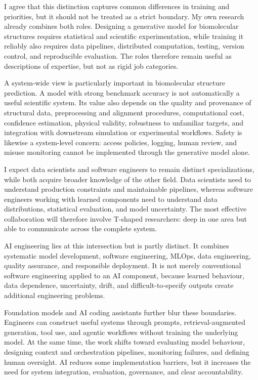 \documentclass[a4paper,11pt]{article}
\begin{document}
I agree that this distinction captures common differences in training and
priorities, but it should not be treated as a strict boundary. My own research
already combines both roles. Designing a generative model for biomolecular
structures requires statistical and scientific experimentation, while training
it reliably also requires data pipelines, distributed computation, testing,
version control, and reproducible evaluation. The roles therefore remain useful
as descriptions of expertise, but not as rigid job categories.

A system-wide view is particularly important in biomolecular structure
prediction. A model with strong benchmark accuracy is not automatically a
useful scientific system. Its value also depends on the quality and provenance
of structural data, preprocessing and alignment procedures, computational cost,
confidence estimation, physical validity, robustness to unfamiliar targets,
and integration with downstream simulation or experimental workflows. Safety
is likewise a system-level concern: access policies, logging, human review, and
misuse monitoring cannot be implemented through the generative model alone.

I expect data scientists and software engineers to remain distinct
specializations, while both acquire broader knowledge of the other field.
Data scientists need to understand production constraints and maintainable
pipelines, whereas software engineers working with learned components need to
understand data distributions, statistical evaluation, and model uncertainty.
The most effective collaboration will therefore involve T-shaped researchers:
deep in one area but able to communicate across the complete system.

AI engineering lies at this intersection but is partly distinct. It combines
systematic model development, software engineering, MLOps, data engineering,
quality assurance, and responsible deployment. It is not merely conventional
software engineering applied to an AI component, because learned behaviour,
data dependence, uncertainty, drift, and difficult-to-specify outputs create
additional engineering problems.

Foundation models and AI coding assistants further blur these boundaries.
Engineers can construct useful systems through prompts, retrieval-augmented
generation, tool use, and agentic workflows without training the underlying
model. At the same time, the work shifts toward evaluating model behaviour,
designing context and orchestration pipelines, monitoring failures, and
defining human oversight. AI reduces some implementation barriers, but it
increases the need for system integration, evaluation, governance, and clear
accountability.
\end{document}

